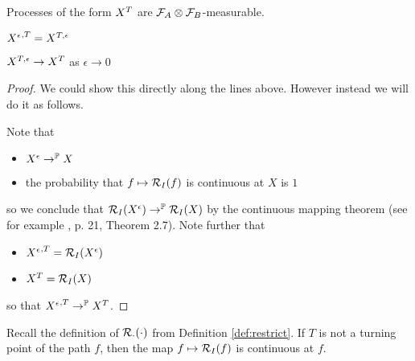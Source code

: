 {\begin{obs}
  Processes of the form $X^T$ are $\mathcal{F}_A \otimes
  \mathcal{F}_B$-measurable.
\end{obs}

\begin{lemma}
  ${X^{\epsilon}}^{,T} = X^{T,\epsilon}$
\end{lemma}

\begin{lemma}
  $X^{T,\epsilon} \to X^T$ as $\epsilon \to 0$
\end{lemma}

\begin{proof}
  We could show this directly along the lines above.  However instead
  we will do it as follows.

  Note that
  \begin{itemize}
  \item $X^{\epsilon} \to^{\mathbb{P}} X$
  \item the probability that $f \mapsto \mathcal{R}_{I}(f)$ is continuous
    at $X$ is $1$
  \end{itemize}
  so we conclude that $\mathcal{R}_{I}(X^{\epsilon}) \to^{\mathbb{P}}
  \mathcal{R}_{I}(X)$ by the continuous mapping theorem (see for
  example \cite{billingsley}, p. 21, Theorem 2.7). Note further that
  \begin{itemize}
  \item ${X^{\epsilon}}^{,T} = \mathcal{R}_{I}(X^{\epsilon})$
  \item $X^T = \mathcal{R}_{I}(X)$
  \end{itemize}
  so that ${X^{\epsilon}}^{,T} \to^{\mathbb{P}} X^T$.
\end{proof}

\begin{lemma}
  Recall the definition of $\mathcal{R}_{\cdot}(\cdot)$ from Definition
  \ref{def:restrict}.  If $T$ is not a turning point of the path $f$,
  then the map $f \mapsto \mathcal{R}_{I}(f)$ is continuous at $f$.
\end{lemma}

}
